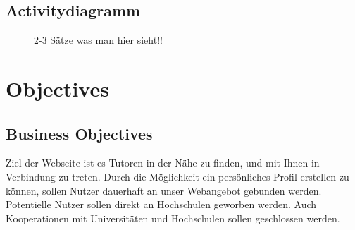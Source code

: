 \documentclass[10pt,a4paper]{scrartcl}
\begin{document}
\subsection{Activitydiagramm}
\begin{figure}[!htbp]
 \caption{2-3 Sätze was man hier sieht!!}
\end{figure}
\newpage
\section{Objectives} 

\subsection{Business Objectives}
Ziel der Webseite ist es Tutoren in der Nähe zu finden, und mit Ihnen in 
Verbindung zu treten. Durch die Möglichkeit ein persönliches Profil erstellen zu 
können, sollen Nutzer dauerhaft an unser Webangebot gebunden werden. 
Potentielle Nutzer sollen direkt an Hochschulen geworben werden. Auch 
Kooperationen mit Universitäten und Hochschulen sollen geschlossen werden.
\end{document}
